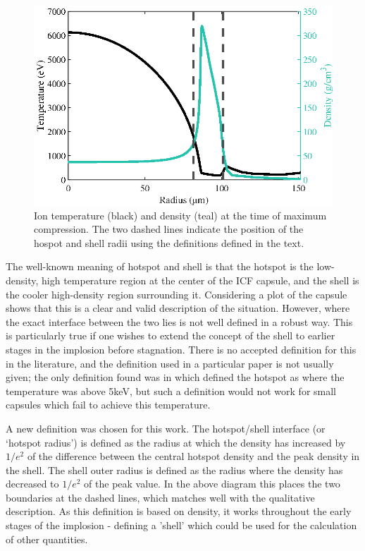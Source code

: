 \begin{figure}[ht]
\centering
\includegraphics{figures/LowCR/HSDefn.eps}
\caption{Ion temperature (black) and density (teal) at the time of maximum compression. The two dashed lines indicate the position of the hospot and shell radii using the definitions defined in the text.}
\label{fig:HsDefn}
\end{figure}

The well-known meaning of hotspot and shell is that the hotspot is the low-density, high temperature region at the center of the ICF capsule, and the shell is the cooler high-density region surrounding it. Considering a plot of the capsule shows that this is a clear and valid description of the situation. However, where the exact interface between the two lies is not well defined in a robust way. This is particularly true if one wishes to extend the concept of the shell to earlier stages in the implosion before stagnation. There is no accepted definition for this in the literature, and the definition used in a particular paper is not usually given; the only definition found was in \cite{Olson2021} which defined the hotspot as where the temperature was above 5keV, but such a definition would not work for small capsules which fail to achieve this temperature.

A new definition was chosen for this work. The hotspot/shell interface (or `hotspot radius') is defined as the radius at which the density has increased by $1/e^2$ of the difference between the central hotspot density and the peak density in the shell. The shell outer radius is defined as the radius where the density has decreased to $1/e^2$ of the peak value. In the above diagram this places the two boundaries at the dashed lines, which matches well with the qualitative description. As this definition is based on density, it works throughout the early stages of the implosion - defining a 'shell' which could be used for the calculation of other quantities. 

